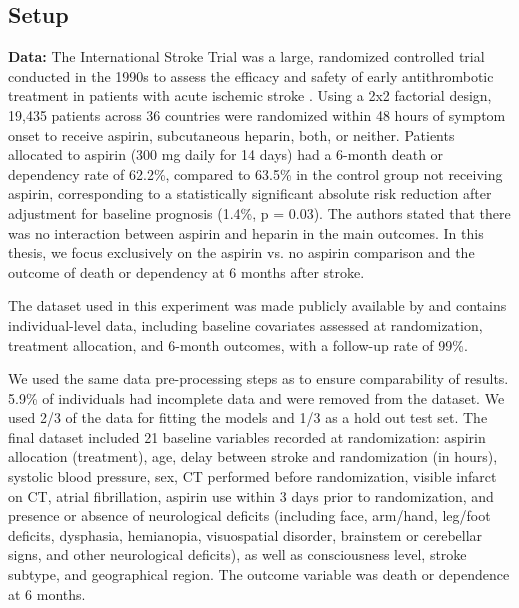 \subsection{Setup} \label{sec:methods_experiment2}



\textbf{Data:} The International Stroke Trial was a large, randomized controlled trial conducted in the 1990s to assess the efficacy and safety of early antithrombotic treatment in patients with acute ischemic stroke \citep{IST1997}. Using a 2x2 factorial design, 19,435 patients across 36 countries were randomized within 48 hours of symptom onset to receive aspirin, subcutaneous heparin, both, or neither. Patients allocated to aspirin (300 mg daily for 14 days) had a 6-month death or dependency rate of 62.2\%, compared to 63.5\% in the control group not receiving aspirin, corresponding to a statistically significant absolute risk reduction after adjustment for baseline prognosis (1.4\%, p = 0.03). The authors stated that there was no interaction between aspirin and heparin in the main outcomes. In this thesis, we focus exclusively on the aspirin vs. no aspirin comparison and the outcome of death or dependency at 6 months after stroke.

The dataset used in this experiment was made publicly available by \citet{sandercock2011} and contains individual-level data, including baseline covariates assessed at randomization, treatment allocation, and 6-month outcomes, with a follow-up rate of 99\%.

We used the same data pre-processing steps as \citet{chen2025} to ensure comparability of results. 5.9\% of individuals had incomplete data and were removed from the dataset. We used 2/3 of the data for fitting the models and 1/3 as a hold out test set. The final dataset included 21 baseline variables recorded at randomization: aspirin allocation (treatment), age, delay between stroke and randomization (in hours), systolic blood pressure, sex, CT performed before randomization, visible infarct on CT, atrial fibrillation, aspirin use within 3 days prior to randomization, and presence or absence of neurological deficits (including face, arm/hand, leg/foot deficits, dysphasia, hemianopia, visuospatial disorder, brainstem or cerebellar signs, and other neurological deficits), as well as consciousness level, stroke subtype, and geographical region. The outcome variable was death or dependence at 6 months.


\medskip

